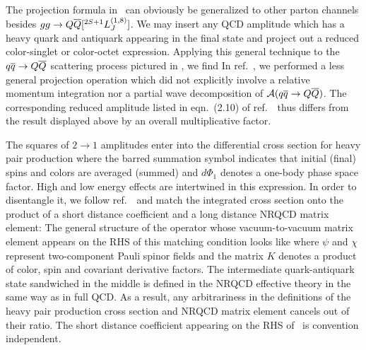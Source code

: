 	The projection formula in \projection\ can obviously be generalized to 
other parton channels besides $gg \to Q{\overline Q}[ ^{2S+1}L_J^{(1,8)}]$.  We may insert 
any QCD amplitude which has a heavy quark and antiquark appearing in the final 
state and project out a reduced color-singlet or color-octet expression.
Applying this general technique to the $q{\overline q} \to Q{\overline Q}$ scattering 
process pictured in \qqbarQQbargraphs, we find 
%
\eqn{}
%
In ref.~\ChoLeibov, we performed a less general projection operation which 
did not explicitly involve a relative momentum integration nor a partial wave 
decomposition of ${\cal A}(q{\overline q} \to Q{\overline Q})$.  The corresponding reduced 
amplitude listed in eqn.~(2.10) of ref.~\ChoLeibov\ thus differs from the 
result displayed above by an overall multiplicative factor.  

	The squares of $2 \to 1$ amplitudes enter into the differential 
cross section for heavy pair production
%
\eqn{}
%
where the barred summation symbol indicates that initial (final) spins and 
colors are averaged (summed) and $d \Phi_1$ denotes a one-body 
phase space factor.   High and low energy effects are intertwined 
in this expression.  In order to disentangle it, we follow ref.~\Bodwin\ and 
match the integrated cross section onto the product of a short distance 
coefficient and a long distance NRQCD matrix element: 
%
\eqn{}
%
The general structure of the operator whose vacuum-to-vacuum matrix element 
appears on the RHS of this matching condition looks like
%
\eqn{} 
%
where $\psi$ and $\chi$ represent two-component Pauli spinor fields and the 
matrix $K$ denotes a product of color, spin and covariant derivative factors.
The intermediate quark-antiquark state sandwiched in the middle 
%
\eqn{}
%
is defined in the NRQCD effective theory in the same way as in full QCD. 
As a result, any arbitrariness in the definitions of the heavy pair 
production cross section and NRQCD matrix element cancels out of their ratio.  
The short distance coefficient appearing on the RHS of \matchI\ is convention 
independent. 

